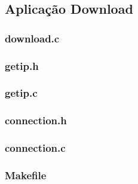 \subsection*{Aplicação Download}

\subsubsection{download.c}


\subsubsection{getip.h}


\subsubsection{getip.c}


\subsubsection{connection.h}


\subsubsection{connection.c}


\subsubsection{Makefile}
